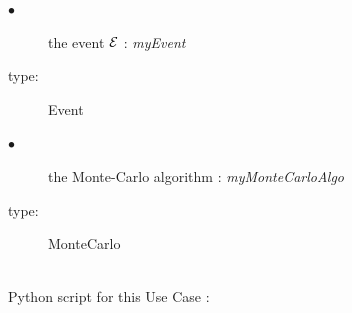 {
  \begin{description}
  \item[$\bullet$] the event ${\mathcal E}$ : {\itshape myEvent}
  \item[type:] Event
  \end{description}

  \begin{description}
  \item[$\bullet$] the Monte-Carlo algorithm : {\itshape myMonteCarloAlgo}
  \item[type:] MonteCarlo
  \end{description}
}

\textspace\\
Python script for this Use Case :


\textspace\\

